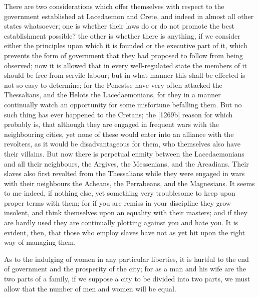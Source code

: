 
There are two considerations which offer themselves with respect to the
government established at Lacedaemon and Crete, and indeed in almost all
other states whatsoever; one is whether their laws do or do not promote
the best establishment possible? the other is whether there is anything,
if we consider either the principles upon which it is founded or the
executive part of it, which prevents the form of government that they had
proposed to follow from being observed; now it is allowed that in every
well-regulated state the members of it should be free from servile labour;
but in what manner this shall be effected is not so easy to determine; for
the Penestse have very often attacked the Thessalians, and the Helots the
Lacedaemonians, for they in a manner continually watch an opportunity for
some misfortune befalling them. But no such thing has ever happened to the
Cretans; the [1269b] reason for which probably is, that although they are
engaged in frequent wars with the neighbouring cities, yet none of these
would enter into an alliance with the revolters, as it would be
disadvantageous for them, who themselves also have their villains. But now
there is perpetual enmity between the Lacedaemonians and all their
neighbours, the Argives, the Messenians, and the Arcadians. Their slaves
also first revolted from the Thessalians while they were engaged in wars
with their neighbours the Acheans, the Perrabeans, and the Magnesians. It
seems to me indeed, if nothing else, yet something very troublesome to
keep upon proper terms with them; for if you are remiss in your discipline
they grow insolent, and think themselves upon an equality with their
masters; and if they are hardly used they are continually plotting against
you and hate you. It is evident, then, that those who employ slaves have
not as yet hit upon the right way of managing them.

As to the indulging of women in any particular liberties, it is hurtful to
the end of government and the prosperity of the city; for as a man and his
wife are the two parts of a family, if we suppose a city to be divided
into two parts, we must allow that the number of men and women will be
equal.

